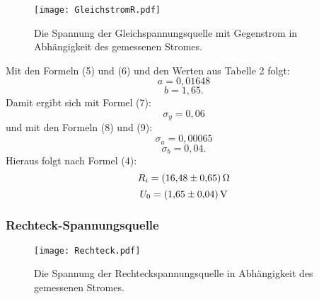 \begin{figure}[H]
	\centering
	\caption{Die Spannung der Gleichspannungsquelle mit Gegenstrom in Abhängigkeit des gemessenen Stromes.}
	\texttt{[image: GleichstromR.pdf]}
	\label{fig:GleichstromR}
\end{figure}

\newpage


Mit den Formeln (5) und (6) und den Werten aus Tabelle 2 folgt:
\begin{displaymath}
a=0,01648
\end{displaymath}
\begin{displaymath}
b=1,65\text{.}
\end{displaymath}
Damit ergibt sich mit Formel (7):
\begin{displaymath}
\sigma_y=0,06
\end{displaymath}
und mit den Formeln (8) und (9):
\begin{displaymath}
\sigma_a=0,00065
\end{displaymath}
\begin{displaymath}
\sigma_b=0,04\text{.}
\end{displaymath}
Hieraus folgt nach Formel (4):
\begin{displaymath}
R_i= \SI{16,48 \pm 0,65}{\ohm}
\end{displaymath}
\begin{displaymath}
U_0= \SI{1,65 \pm 0,04}{\volt}
\end{displaymath}



\subsubsection{Rechteck-Spannungsquelle}

\begin{figure}[H]
	\centering
	\caption{Die Spannung der Rechteckspannungsquelle in Abhängigkeit des gemessenen Stromes.}
	\texttt{[image: Rechteck.pdf]}
	\label{fig:Rechteck}
\end{figure}


